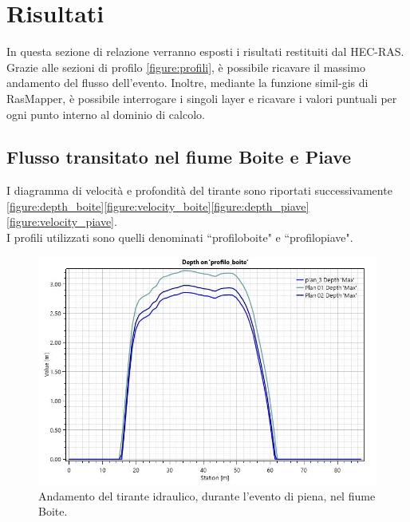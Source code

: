 \section{Risultati}
In questa sezione di relazione verranno esposti i risultati restituiti dal HEC-RAS.\\
Grazie alle sezioni di profilo \eqref{figure:profili}, è possibile ricavare il massimo andamento del flusso dell'evento. Inoltre, mediante la funzione simil-gis di RasMapper, è possibile interrogare i singoli layer e ricavare i valori puntuali per ogni punto interno al dominio di calcolo.

\subsection{Flusso transitato nel fiume Boite e Piave}
I diagramma di velocità e profondità del tirante sono riportati successivamente \eqref{figure:depth_boite}\eqref{figure:velocity_boite}\eqref{figure:depth_piave}\eqref{figure:velocity_piave}.\\
I profili utilizzati sono quelli denominati ``profilo\textunderscore boite" e ``profilo\textunderscore piave".

\begin{figure}[htb] \centering
    \includegraphics[scale=0.5]{immagini/depth_boite.JPG}
    \caption{Andamento del tirante idraulico, durante l'evento di piena, nel fiume Boite.}
    \label{figure:depth_boite}
\end{figure}

